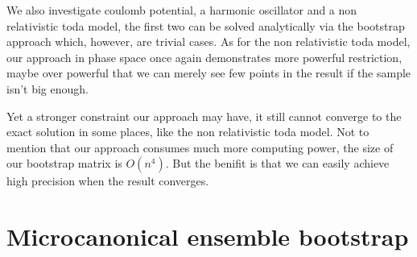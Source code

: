 \documentclass[aps,prl, preprint,amsmath, amssymb]{revtex4-2}
\begin{document}
We also investigate coulomb potential, a harmonic oscillator and a non relativistic toda model, the first two can be solved analytically via the bootstrap approach which, however, are trivial cases. As for the non relativistic toda model, our approach in phase space once again demonstrates more powerful restriction, maybe over powerful that we can merely see few points in the result if the sample isn't big enough.

Yet a stronger constraint our approach may have, it still cannot converge to the exact solution in some places, like the non relativistic toda model. Not to mention that our approach consumes much more computing power, the size of our bootstrap matrix is ${O}(n^4)$. But the benifit is that we can easily achieve high precision when the result converges.

\section{Microcanonical ensemble bootstrap}
\end{document}
